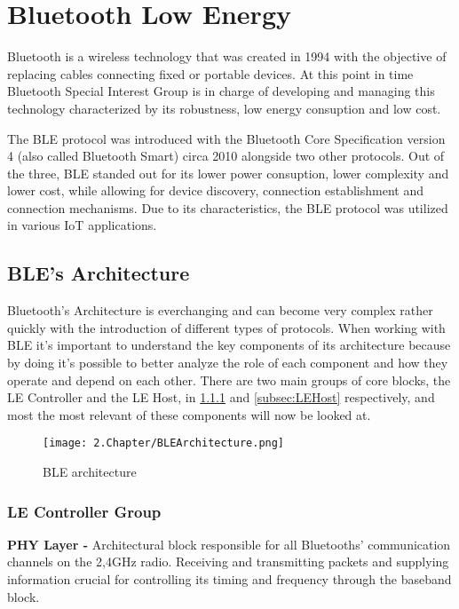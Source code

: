 \section{Bluetooth Low Energy}
\label{sec:ble}

Bluetooth is a wireless technology that was created in 1994 with the objective of replacing cables connecting fixed or portable devices. At this point in time Bluetooth Special Interest Group is in charge of developing and managing this technology characterized by its robustness, low energy consuption and low cost. 

The \ac{BLE} protocol was introduced with the Bluetooth Core Specification version 4 (also called Bluetooth Smart) circa 2010 alongside two other protocols.  Out of the three, \ac{BLE} standed out for its lower power consuption, lower complexity and lower cost, while allowing for  device discovery, connection establishment and connection mechanisms. Due to its characteristics, the \ac{BLE} protocol was utilized in various \ac{IoT} applications.  

\subsection{\ac{BLE}'s Architecture}
\label{subsec:BLEArchitecture}

Bluetooth's Architecture is everchanging and can become very complex rather quickly with the introduction of different types of protocols.
 When working with \ac{BLE} it's important to understand the key components of its architecture  because by doing it's possible to better analyze the role of each component and how they operate and depend on each other. There are two main groups of core blocks, the \ac{LE} Controller and the \ac{LE} Host, in \ref{subsec:LEController} and \ref{subsec:LEHost} respectively, and most the most relevant of these components will now be looked at.
 
 \begin{figure}[H]
	\centering
		\texttt{[image: 2.Chapter/BLEArchitecture.png]}
	\caption[\ac{BLE} Architecture]{\ac{BLE} architecture}
	\label{fig:BLEarchitecture}
\end{figure}

\subsubsection{ \ac{LE} Controller Group}
\label{subsec:LEController}

\textbf{\ac{PHY} Layer -} Architectural block responsible for all Bluetooths' communication channels on the 2,4GHz radio. Receiving and transmitting packets and supplying information crucial for controlling its timing and frequency through the baseband block.


